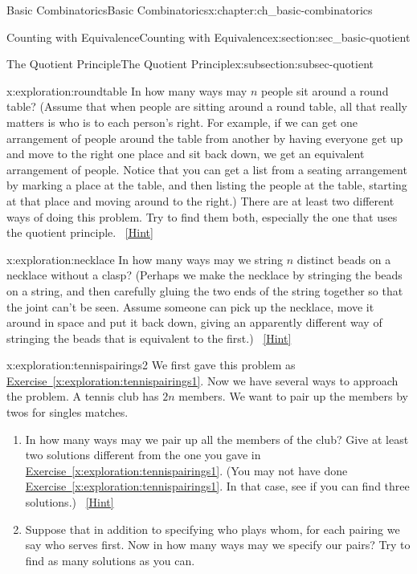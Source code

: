 \documentclass[oneside,10pt,]{book}
\numberwithin{equation}{chapter}
\begin{document}
\begin{chapterptx}{Basic Combinatorics}{}{Basic Combinatorics}{}{}{x:chapter:ch_basic-combinatorics}
\begin{sectionptx}{Counting with Equivalence}{}{Counting with Equivalence}{}{}{x:section:sec_basic-quotient}
\begin{subsectionptx}{The Quotient Principle}{}{The Quotient Principle}{}{}{x:subsection:subsec-quotient}
\begin{exploration}{}{x:exploration:roundtable}
In how many ways may \(n\) people sit around a round table? (Assume that when people are sitting around a round table, all that really matters is who is to each person's right. For example, if we can get one arrangement of people around the table from another by having everyone get up and move to the right one place and sit back down, we get an equivalent arrangement of people. Notice that you can get a list from a seating arrangement by marking a place at the table, and then listing the people at the table, starting at that place and moving around to the right.) There are at least two different ways of doing this problem. Try to find them both, especially the one that uses the quotient principle.%
\qquad~\hfill{\tiny\hyperlink{g:hint:idm1850-back}{[Hint]}}\end{exploration}
\begin{exploration}{}{x:exploration:necklace}%
In how many ways may we string \(n\) distinct beads on a necklace without a clasp? (Perhaps we make the necklace by stringing the beads on a string, and then carefully gluing the two ends of the string together so that the joint can't be seen. Assume someone can pick up the necklace, move it around in space and put it back down, giving an apparently different way of stringing the beads that is equivalent to the first.)%
\qquad~\hfill{\tiny\hyperlink{g:hint:idm1871-back}{[Hint]}}\end{exploration}
\begin{exploration}{}{x:exploration:tennispairings2}%
We first gave this problem as \hyperref[x:exploration:tennispairings1]{Exercise~\ref{x:exploration:tennispairings1}}. Now we have several ways to approach the problem. A tennis club has \(2n\) members. We want to pair up the members by twos for singles matches.%
\begin{enumerate}[font=\bfseries,label=(\alph*),ref=\alph*]
\item{}In how many ways may we pair up all the members of the club? Give at least two solutions different from the one you gave in   \hyperref[x:exploration:tennispairings1]{Exercise~\ref{x:exploration:tennispairings1}}. (You may not have done \hyperref[x:exploration:tennispairings1]{Exercise~\ref{x:exploration:tennispairings1}}. In that case, see if you can find three solutions.)%
\qquad~\hfill{\tiny\hyperlink{g:hint:idm1897-back}{[Hint]}}\item{}Suppose that in addition to specifying who plays whom, for each pairing we say who serves first.  Now in how many ways may we specify our pairs? Try to find as many solutions as you can.%

\end{enumerate}
\end{exploration}
\end{subsectionptx}
\end{sectionptx}
\end{chapterptx}
\end{document}
